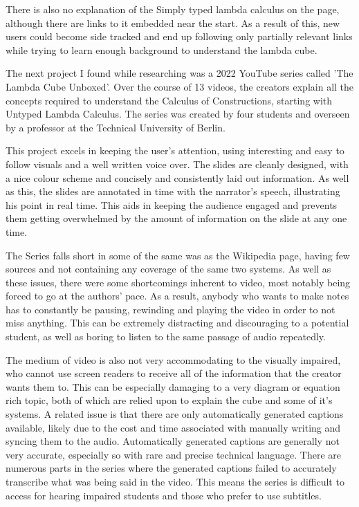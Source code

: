 \documentclass{l4proj}
\begin{document}
There is also no explanation of the Simply typed lambda calculus on the page, although there are links to it embedded near the start.  As a result of this, new users could become side tracked and end up following only partially relevant links while trying to learn enough background to understand the lambda cube.

The next project I found while researching was a 2022 YouTube series called 'The Lambda Cube Unboxed'.  Over the course of 13 videos, the creators explain all the concepts required to understand the Calculus of Constructions, starting with Untyped Lambda Calculus.  The series was created by four students and overseen by a professor at the Technical University of Berlin.

This project excels in keeping the user's attention, using interesting and easy to follow visuals and a well written voice over.  The slides are cleanly designed, with a nice colour scheme and concisely and consistently laid out information.  As well as this, the slides are annotated in time with the narrator's speech, illustrating his point in real time.  This aids in keeping the audience engaged and prevents them getting overwhelmed by the amount of information on the slide at any one time.

The Series falls short in some of the same was as the Wikipedia page, having few sources and not containing any coverage of the same two systems.  As well as these issues, there were some shortcomings inherent to video, most notably being forced to go at the authors' pace.  As a result, anybody who wants to make notes has to constantly be pausing, rewinding and playing the video in order to not miss anything.  This can be extremely distracting and discouraging to a potential student, as well as boring to listen to the same passage of audio repeatedly.

The medium of video is also not very accommodating to the visually impaired, who cannot use screen readers to receive all of the information that the creator wants them to.  This can be especially damaging to a very diagram or equation rich topic, both of which are relied upon to explain the cube and some of it's systems.  A related issue is that there are only automatically generated captions available, likely due to the cost and time associated with manually writing and syncing them to the audio.  Automatically generated captions are generally not very accurate, especially so with rare and precise technical language.  There are numerous parts in the series where the generated captions failed to accurately transcribe what was being said in the video.  This means the series is difficult to access for hearing impaired students and those who prefer to use subtitles.
\end{document}
